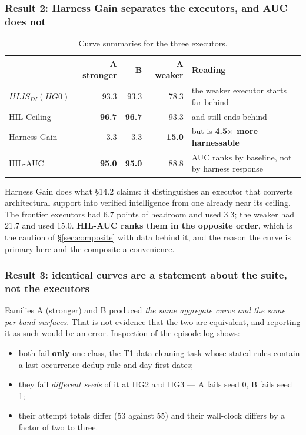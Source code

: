 \documentclass[11pt]{article}
\theoremstyle{definition}
\begin{document}
\subsubsection{Result 2: Harness Gain separates the executors, and AUC does not}

\begin{table}[H]
\centering\small
\begin{tabularx}{\textwidth}{@{}lrrrY@{}}
\toprule
& A stronger & B & A weaker & Reading \\
\midrule
$HLIS_{DI}(HG0)$ & 93.3 & 93.3 & 78.3 & the weaker executor starts far behind \\
HIL-Ceiling & \textbf{96.7} & \textbf{96.7} & 93.3 & and still ends behind \\
Harness Gain & 3.3 & 3.3 & \textbf{15.0} & but is \textbf{4.5$\times$ more harnessable} \\
HIL-AUC & \textbf{95.0} & \textbf{95.0} & 88.8 & AUC ranks by baseline, not by harness response \\
\bottomrule
\end{tabularx}
\caption{Curve summaries for the three executors.}
\label{tab:curvesummary}
\end{table}

Harness Gain does what \S14.2 claims: it distinguishes an executor that converts architectural support into verified intelligence from one already near its ceiling. The frontier executors had 6.7 points of headroom and used 3.3; the weaker had 21.7 and used 15.0. \textbf{HIL-AUC ranks them in the opposite order}, which is the caution of \S\ref{sec:composite} with data behind it, and the reason the curve is primary here and the composite a convenience.

\subsubsection{Result 3: identical curves are a statement about the suite, not the executors}

Families A (stronger) and B produced \emph{the same aggregate curve and the same per-band surfaces}. That is not evidence that the two are equivalent, and reporting it as such would be an error. Inspection of the episode log shows:

\begin{itemize}
\item both fail \textbf{only} one class, the T1 data-cleaning task whose stated rules contain a last-occurrence dedup rule and day-first dates;
\item they fail \emph{different seeds} of it at HG2 and HG3 --- A fails seed 0, B fails seed 1;
\item their attempt totals differ (53 against 55) and their wall-clock differs by a factor of two to three.
\end{itemize}
\end{document}
